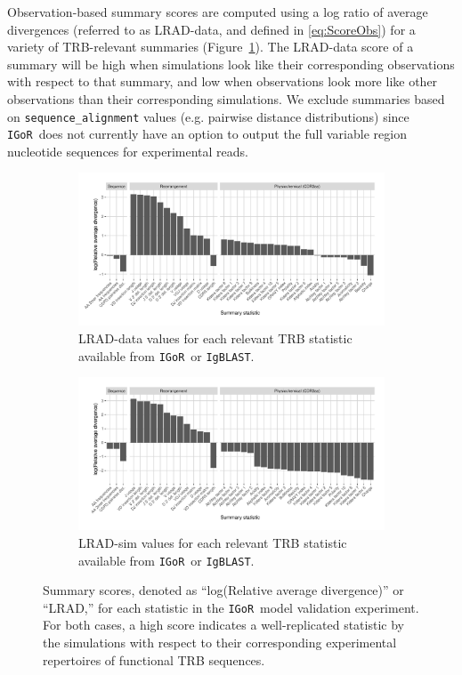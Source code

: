 \documentclass{article}
\newcommand{\igor}{\texttt{IGoR}}
\newcommand{\igblast}{\texttt{IgBLAST}}
\begin{document}
Observation-based summary scores are computed using a log ratio of average divergences (referred to as LRAD-data, and defined in \eqref{eq:ScoreObs}) for a variety of TRB-relevant summaries (Figure~\ref{fig:ObsScoresTCR}).
The LRAD-data score of a summary will be high when simulations look like their corresponding observations with respect to that summary, and low when observations look more like other observations than their corresponding simulations.
We exclude summaries based on \texttt{sequence\_alignment} values (e.g. pairwise distance distributions) since \igor\ does not currently have an option to output the full variable region nucleotide sequences for experimental reads.
\begin{figure}
	\begin{subfigure}{\textwidth}
    	\includegraphics[width=\linewidth]{Figures/IgorScores/obs_score_plot.pdf}
    	\caption{LRAD-data values for each relevant TRB statistic available from \igor\ or \igblast.
        }
    	\label{fig:ObsScoresTCR}
	\end{subfigure}
	\begin{subfigure}{\textwidth}
    	\includegraphics[width=\linewidth]{Figures/IgorScores/sim_score_plot.pdf}
    	\caption{LRAD-sim values for each relevant TRB statistic available from \igor\ or \igblast.
    	}
    	\label{fig:SimScoresTCR}
	\end{subfigure}
	\caption{Summary scores, denoted as ``log(Relative average divergence)'' or ``LRAD,'' for each statistic in the \igor\ model validation experiment. For both cases, a high score indicates a well-replicated statistic by the simulations with respect to their corresponding experimental repertoires of functional TRB sequences.}
	\label{fig:TCRScores}
\end{figure}
\end{document}
